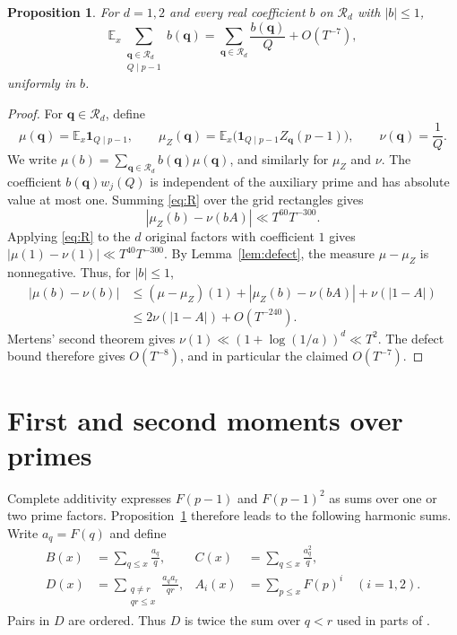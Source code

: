 \documentclass[10pt]{article}
\newtheorem{prop}[thm]{Proposition}
\newcommand{\EE}{\mathbb E}
\newcommand{\calR}{\mathcal R}
\newcommand{\ind}{\mathbf 1}
\begin{document}
\begin{prop}\label{prop:weighted}
For $d=1,2$ and every real coefficient $b$ on $\calR_d$ with $|b|\leq1$,
\begin{equation}\label{eq:weighted}
 \EE_x\sum_{\substack{\mathbf q\in\calR_d\\Q\mid p-1}}b(\mathbf q)
 =\sum_{\mathbf q\in\calR_d}\frac{b(\mathbf q)}Q+O(T^{-7}),
\end{equation}
uniformly in $b$.
\end{prop}
\begin{proof}
For $\mathbf q\in\calR_d$, define
\[
 \mu(\mathbf q)=\EE_x\ind_{Q\mid p-1},\qquad
 \mu_Z(\mathbf q)=\EE_x\bigl(\ind_{Q\mid p-1}Z_{\mathbf q}(p-1)\bigr),\qquad
 \nu(\mathbf q)=\frac1Q.
\]
We write $\mu(b)=\sum_{\mathbf q\in\calR_d}b(\mathbf q)\mu(\mathbf q)$, and similarly for $\mu_Z$ and $\nu$. The coefficient $b(\mathbf q)w_j(Q)$ is independent of the auxiliary prime and has absolute value at most one. Summing \eqref{eq:R} over the grid rectangles gives
\[
 |\mu_Z(b)-\nu(bA)|\ll T^{60}T^{-300}.
\]
Applying \eqref{eq:R} to the $d$ original factors with coefficient $1$ gives $|\mu(1)-\nu(1)|\ll T^{40}T^{-300}$. By Lemma~\ref{lem:defect}, the measure $\mu-\mu_Z$ is nonnegative. Thus, for $|b|\leq1$,
\begin{align*}
 |\mu(b)-\nu(b)|
 &\leq (\mu-\mu_Z)(1)+|\mu_Z(b)-\nu(bA)|
          +\nu(|1-A|)\\
 &\leq 2\nu(|1-A|)+O(T^{-240}).
\end{align*}
Mertens' second theorem gives $\nu(1)\ll(1+\log(1/a))^d\ll T^2$. The defect bound therefore gives $O(T^{-8})$, and in particular the claimed $O(T^{-7})$.
\end{proof}

\section{First and second moments over primes}\label{sec:moments}

Complete additivity expresses $F(p-1)$ and $F(p-1)^2$ as sums over one or two prime factors. Proposition~\ref{prop:weighted} therefore leads to the following harmonic sums. Write $a_q=F(q)$ and define
\begin{align*}
 B(x)&=\sum_{q\leq x}\frac{a_q}{q},&
 C(x)&=\sum_{q\leq x}\frac{a_q^2}{q},\\
 D(x)&=\sum_{\substack{q\ne r\\qr\leq x}}\frac{a_qa_r}{qr},&
 A_i(x)&=\sum_{p\leq x}F(p)^i\quad(i=1,2).
\end{align*}
Pairs in $D$ are ordered. Thus $D$ is twice the sum over $q<r$ used in parts of \cite[Section~2]{EGPS}.
\end{document}
